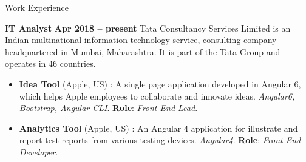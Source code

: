 \documentclass{resume}
\begin{document}
\begin{category}{Work Experience}
  
  \citemnobullet \textbf{IT Analyst} \hfill \textbf{Apr 2018 -- present}
  \citemnobullet Tata Consultancy Services Limited is an Indian multinational information technology service, consulting company headquartered in Mumbai, Maharashtra. It is part of the Tata Group and operates in 46 countries.
  \begin{itemize}
  \item \textbf{Idea Tool} (Apple, US) : A single page application developed in Angular 6, which helps Apple employees to collaborate and innovate ideas. {\em Angular6, Bootstrap, Angular CLI}. \textbf{Role}: {\em Front End Lead}. 
  \item \textbf{Analytics Tool} (Apple, US) : An Angular 4 application for illustrate and report test reports from various testing devices. {\em Angular4}. \textbf{Role}: {\em Front End Developer}. 
  \end{itemize}


\end{category}
\end{document}
